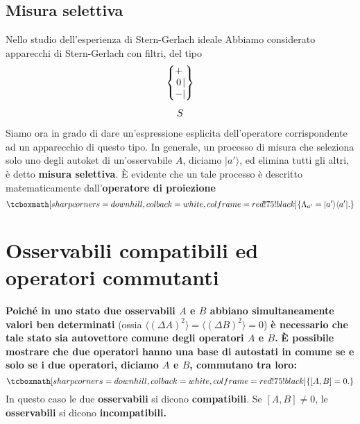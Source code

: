 \documentclass[a4paper,12pt,oneside]{book}
\begin{document}
\subsection{Misura selettiva}
Nello studio dell'esperienza di Stern-Gerlach ideale Abbiamo considerato apparecchi di Stern-Gerlach con filtri, del tipo
	\begin{equation}
		\begin{matrix}
		\begin{Bmatrix}
 			\makebox[\widthof{$-$}]{$+$}\makebox[\widthof{$|$}]{$\ $} \\ \makebox[\widthof{$-$}]{$0$}|\\ - | 
		\end{Bmatrix} \\[0.7cm]
			S
		\end{matrix}
	\end{equation}
Siamo ora in grado di dare un'espressione esplicita dell'operatore corrispondente ad un apparecchio di questo tipo. In generale, un processo di misura che seleziona solo uno degli autoket di un'osservabile $A$, diciamo $\vert a' \rangle $, ed elimina tutti gli altri, è detto \textbf{misura selettiva}. È evidente che un tale processo è descritto matematicamente dall'\textbf{operatore di proiezione}
	\begin{equation}
		\tcboxmath[sharp corners=downhill ,colback=white,colframe=red!75!black]{
		\Lambda _{a'} = \vert a' \rangle \langle a'\vert.
		}
	\end{equation}
\section{Osservabili compatibili ed operatori commutanti}
\textbf{Poiché in uno stato due osservabili $A$ e $B$ abbiano simultaneamente valori ben determinati} (ossia $\langle (\Delta A ) ^2 \rangle = \langle (\Delta B ) ^2 \rangle =0$) \textbf{è necessario che tale stato sia autovettore comune degli operatori $A$ e $B$.} \textbf{È possibile mostrare che due operatori hanno una base di autostati in comune se e solo se i due operatori, diciamo $A$ e $B$, commutano tra loro:}
	\begin{equation}
		\tcboxmath[sharp corners=downhill ,colback=white,colframe=red!75!black]{
			\left[ A, B \right] =0.
			}
	\end{equation}
In questo caso le due \textbf{osservabili} si dicono \textbf{compatibili}. Se $\left[ A, B\right] \neq 0$, le \textbf{osservabili} si dicono \textbf{incompatibili.}\\
\end{document}
